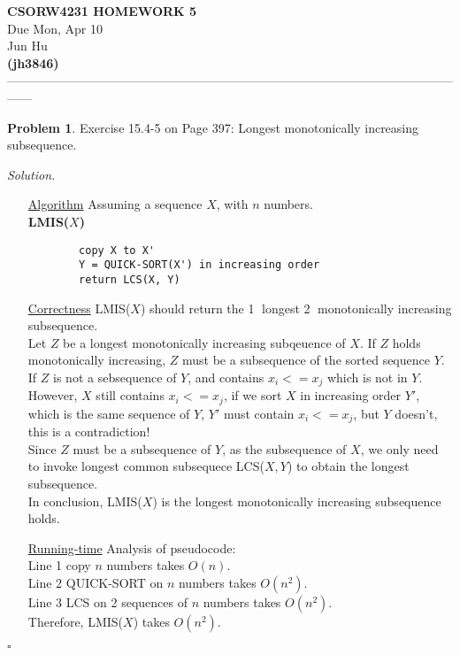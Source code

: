 \documentclass[11pt]{article}
\theoremstyle{definition}
\newtheorem{problem}{Problem}
\newenvironment{solution}{\noindent\emph{Solution.}}{\hfill$\square$}
\newcommand\tab[1][1cm]{\hspace*{#1}}
\begin{document}
\begin{center}
\Large{} 
\textbf{CSORW4231 HOMEWORK 5} \\
\normalsize{}
Due Mon, Apr 10\\
\large{Jun Hu \\
\textbf{(jh3846)}} \\ 
------------------------------------------------------------------------------------------------------------------
\end{center}

\begin{problem}
\large{Exercise 15.4-5 on Page 397: Longest monotonically increasing subsequence.}
\end{problem}

\begin{solution}
\begin{enumerate}
    \item[\underline{Algorithm}]
Assuming  a sequence $X$, with $n$ numbers.\\
\textbf{LMIS($X$)}
\begin{lstlisting}
		copy X to X'
		Y = QUICK-SORT(X') in increasing order
		return LCS(X, Y)
\end{lstlisting}

 \item[\underline{Correctness}]
LMIS($X$) should return the \textcircled{1} longest \textcircled{2} monotonically increasing subsequence.\\
\tab Let $Z$ be a longest monotonically increasing subqeuence of $X$. If $Z$ holds monotonically increasing, $Z$ must be a subsequence of the sorted sequence $Y$. If $Z$ is not a sebsequence of $Y$, and contains $x_i <= x_j$ which is not in $Y$. However, $X$ still contains $x_i <= x_j$, if we sort $X$ in increasing order $Y'$, which is the same sequence of $Y$, $Y'$ must contain $x_i <= x_j$, but $Y$ doesn't, this is a contradiction! \\
\tab  Since $Z$ must be a subsequence of $Y$,  as the subsequence of $X$, we only need to invoke longest common subsequece LCS($X,Y$) to obtain the longest subsequence.\\
\tab In conclusion, LMIS($X$) is the longest monotonically increasing subsequence holds.

 \item[\underline{Running-time}]
Analysis of pseudocode:\\
Line 1 copy $n$ numbers takes $O(n)$.\\
Line 2 QUICK-SORT on $n$ numbers takes $O(n^2)$.\\
Line 3 LCS on 2 sequences of $n$ numbers takes $O(n^2)$.\\
Therefore, LMIS($X$) takes $O(n^2)$.

    
\end{enumerate}

\end{solution}
\end{document}

